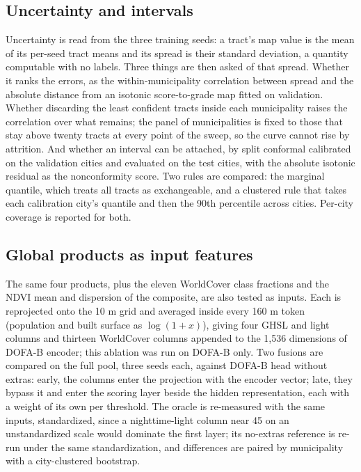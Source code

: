 \documentclass[11pt]{article}
\begin{document}
\subsection{Uncertainty and intervals}

Uncertainty is read from the three training seeds: a tract's map value is the mean of
its per-seed tract means and its spread is their standard deviation, a quantity
computable with no labels. Three things are then asked of that spread. Whether it ranks
the errors, as the within-municipality correlation between spread and the absolute
distance from an isotonic score-to-grade map fitted on validation. Whether discarding
the least confident tracts inside each municipality raises the correlation over what
remains; the panel of municipalities is fixed to those that stay above twenty tracts at
every point of the sweep, so the curve cannot rise by attrition. And whether an interval
can be attached, by split conformal calibrated on the validation cities and evaluated on
the test cities, with the absolute isotonic residual as the nonconformity score. Two
rules are compared: the marginal quantile, which treats all tracts as exchangeable, and
a clustered rule that takes each calibration city's quantile and then the 90th
percentile across cities. Per-city coverage is reported for both.

\subsection{Global products as input features}

The same four products, plus the eleven WorldCover class fractions and the NDVI mean and
dispersion of the composite, are also tested as inputs. Each is reprojected onto the 10 m
grid and averaged inside every 160 m token (population and built surface as
$\log(1 + x)$), giving four GHSL and light columns and thirteen WorldCover columns
appended to the 1{,}536 dimensions of DOFA-B encoder; this ablation was run on
DOFA-B only. Two fusions are compared on the full pool,
three seeds each, against DOFA-B head without extras: early, the columns enter the projection
with the encoder vector; late, they bypass it and enter the scoring layer beside the
hidden representation, each with a weight of its own per threshold. The oracle is
re-measured with the same inputs, standardized, since a nighttime-light column near 45
on an unstandardized scale would dominate the first layer; its no-extras reference is
re-run under the same standardization, and differences are paired by municipality with
a city-clustered bootstrap.
\end{document}
